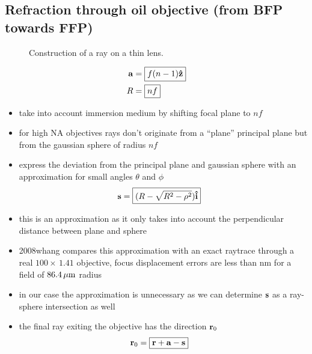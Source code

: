 \documentclass[twocolumn,DIV19]{scrartcl}
\begin{document}
\subsection{Refraction through oil objective (from BFP towards FFP)}
\begin{figure}[!hbt]
  \centering
  
  \caption{Construction of a ray on a thin lens.}
\end{figure}
\begin{align}
  \mathbf{a} &= \boxed{f (n-1) \mathbf{\hat{z}}} \\
  R &= \boxed{nf}
\end{align}
\begin{itemize}
\item take into account immersion medium by shifting focal plane to
  $nf$
\item for high NA objectives rays don't originate from a ``plane''
  principal plane but from the gaussian sphere of radius $nf$
\item express the deviation from the principal plane and gaussian
  sphere with an approximation for small angles $\theta$ and $\phi$
\begin{align}
  \mathbf{s} &= \boxed{(R - \sqrt{R^2-\rho^2})\mathbf{\hat{i}}}
\end{align}
\item this is an approximation as it only takes into account the
  perpendicular distance between plane and sphere
\item 2008whang compares this approximation with an exact raytrace
  through a real $100\times\,1.41$ objective, focus displacement
  errors are less than \unit[130]{nm} for a field of $\unit[86.4]{\mu
    m}$ radius
\item in our case the approximation is unnecessary as we can determine
  $\mathbf{s}$ as a ray-sphere intersection as well
\item the final ray exiting the objective has the direction $\mathbf{r}_0$
\begin{align}
  \mathbf{r}_0 &= \boxed{\mathbf{r} + \mathbf{a} - \mathbf{s}}
\end{align}
\end{itemize}
\end{document}
